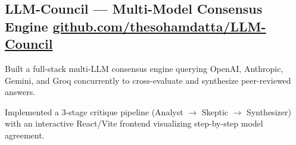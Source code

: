 \subsection[LLM-Council --- Multi-Model Consensus Engine]{{LLM-Council} \textnormal{--- Multi-Model Consensus Engine} \hfill \href{https://github.com/thesohamdatta/LLM-Council}{github.com/thesohamdatta/LLM-Council}}
\begin{zitemize}
\item Built a full-stack multi-LLM consensus engine querying OpenAI, Anthropic, Gemini, and Groq concurrently to cross-evaluate and synthesize peer-reviewed answers.
\item Implemented a 3-stage critique pipeline (Analyst $\rightarrow$ Skeptic $\rightarrow$ Synthesizer) with an interactive React/Vite frontend visualizing step-by-step model agreement.
\end{zitemize}
\vspace{-0.3em}
